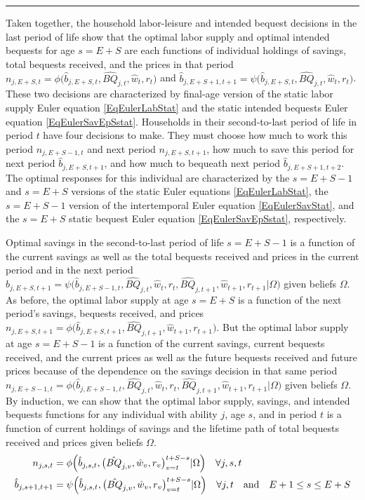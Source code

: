     \hrule
    \begin{spacing}{1.5}
    \vspace{10mm}

    \noindent Taken together, the household labor-leisure and intended bequest decisions in the last period of life show that the optimal labor supply and optimal intended bequests for age $s=E+S$ are each functions of individual holdings of savings, total bequests received, and the prices in that period $n_{j,E+S,t}=\phi\bigl(\hat{b}_{j,E+S,t},\hat{BQ}_{j,t},\hat{w}_t,r_t\bigr)$ and $\hat{b}_{j,E+S+1,t+1}=\psi\bigl(\hat{b}_{j,E+S,t},\hat{BQ}_{j,t},\hat{w}_t,r_t\bigr)$. These two decisions are characterized by final-age version of the static labor supply Euler equation \eqref{EqEulerLabStat} and the static intended bequests Euler equation \eqref{EqEulerSavEpSstat}. Households in their second-to-last period of life in period $t$ have four decisions to make. They must choose how much to work this period $n_{j,E+S-1,t}$ and next period $n_{j,E+S,t+1}$, how much to save this period for next period $\hat{b}_{j,E+S,t+1}$, and how much to bequeath next period $\hat{b}_{j,E+S+1,t+2}$. The optimal responses for this individual are characterized by the $s=E+S-1$ and $s=E+S$ versions of the static Euler equations \eqref{EqEulerLabStat}, the $s=E+S-1$ version of the intertemporal Euler equation \eqref{EqEulerSavStat}, and the $s=E+S$ static bequest Euler equation \eqref{EqEulerSavEpSstat}, respectively.

    Optimal savings in the second-to-last period of life $s=E+S-1$ is a function of the current savings as well as the total bequests received and prices in the current period and in the next period $\hat{b}_{j,E+S,t+1} = \psi\bigl(\hat{b}_{j,E+S-1,t},\hat{BQ}_{j,t},\hat{w}_t,r_t,\hat{BQ}_{j,t+1},\hat{w}_{t+1},r_{t+1}|\Omega\bigr)$ given beliefs $\Omega$. As before, the optimal labor supply at age $s=E+S$ is a function of the next period's savings, bequests received, and prices $n_{j,E+S,t+1}=\phi\bigl(\hat{b}_{j,E+S,t+1},\hat{BQ}_{j,t+1},\hat{w}_{t+1},r_{t+1}\bigr)$. But the optimal labor supply at age $s=E+S-1$ is a function of the current savings, current bequests received, and the current prices as well as the future bequests received and future prices because of the dependence on the savings decision in that same period $n_{j,E+S-1,t}=\phi\bigl(\hat{b}_{j,E+S-1,t},\hat{BQ}_{j,t},\hat{w}_t,r_t,\hat{BQ}_{j,t+1},\hat{w}_{t+1},r_{t+1}|\Omega\bigr)$ given beliefs $\Omega$. By induction, we can show that the optimal labor supply, savings, and intended bequests functions for any individual with ability $j$, age $s$, and in period $t$ is a function of current holdings of savings and the lifetime path of total bequests received and prices given beliefs $\Omega$.
    \begin{align}
      n_{j,s,t} &= \phi\Bigl(\hat{b}_{j,s,t},\bigl(\hat{BQ}_{j,v},\hat{w}_v,r_v\bigr)_{v=t}^{t+S-s}|\Omega\Bigr) \quad\forall j,s,t \label{EqLabPolFuncGen} \\
      \hat{b}_{j,s+1,t+1} &= \psi\Bigl(\hat{b}_{j,s,t},\bigl(\hat{BQ}_{j,v},\hat{w}_v,r_v\bigr)_{v=t}^{t+S-s}|\Omega\Bigr) \quad\forall j,t \quad\text{and}\quad E+1\leq s\leq E+S \label{EqSavPolFuncGen}
    \end{align}


\end{spacing}
